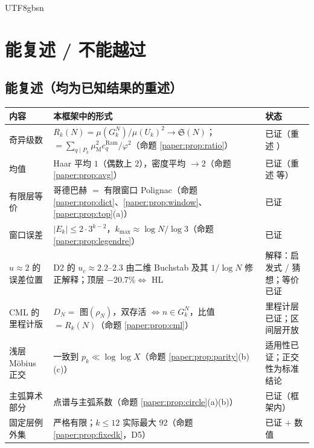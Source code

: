 \documentclass[11pt,a4paper]{article}
\newcommand{\Haar}{\mu}
\newcommand{\Sing}{\mathfrak S}
\newcommand{\kmax}{k_{\max}}           %
\newcommand{\Mob}{\mu_{\mathrm{M}}}    %
\newcommand{\Ram}{c^{\mathrm{Ram}}}    %
\theoremstyle{plain}
\theoremstyle{definition}
\begin{document}
\begin{CJK}{UTF8}{gbsn}
\section{能复述 / 不能越过}\label{paper:sec:list}

\subsection{能复述（均为已知结果的重述）}
\begin{center}
\small
\begin{tabular}{p{3.6cm}p{7.2cm}p{3.8cm}}
\hline
内容 & 本框架中的形式 & 状态\\
\hline
奇异级数 & $R_k(N)=\Haar(G_k^N)/\Haar(U_k)^2\to\Sing(N)$；$=\sum_{q\mid P_k}\Mob^2\Ram_q/\varphi^2$（命题 \ref{paper:prop:ratio}） & 已证（重述 \cite{HL23}）\\
均值 & Haar 平均 $1$（偶数上 $2$），密度平均 $\to2$（命题 \ref{paper:prop:avg}） & 已证（重述 \cite{Gal76} 等）\\
有限层等价 & 哥德巴赫 $=$ 有限窗口 Polignac（命题 \ref{paper:prop:dict}、\ref{paper:prop:window}、\ref{paper:prop:top}(a)） & 已证\\
窗口误差 & $|E_k|\le2\cdot3^{k-2}$，$\kmax\approx\log N/\log3$（命题 \ref{paper:prop:legendre}） & 已证\\
$u\approx2$ 的误差位置 & D2 的 $u_c\approx2.2$--$2.3$ 由二维 Buchstab 及其 $1/\log N$ 修正解释；顶层 $-20.7\%\iff$ HL & 解释：启发式 / 猜想；等价已证\\
CML 的里程计版 & $D_N=$ 图$(\rho_N)$，双存活 $\iff n\in G_k^N$，比值 $=R_k(N)$（命题 \ref{paper:prop:cml}） & 里程计层已证；区间层开放\\
浅层 M\"obius 正交 & 一致到 $p_k\ll\log\log X$（命题 \ref{paper:prop:parity}(b)(c)） & 适用性已证；正交性为标准结论\\
主弧算术部分 & 点谱与主弧系数（命题 \ref{paper:prop:circle}(a)(b)） & 已证（框架内）\\
固定层例外集 & 严格有限；$k\le12$ 实际最大 $92$（命题 \ref{paper:prop:fixedk}，D5） & 已证 $+$ 数值\\
\hline
\end{tabular}
\end{center}


\end{CJK}
\end{document}
